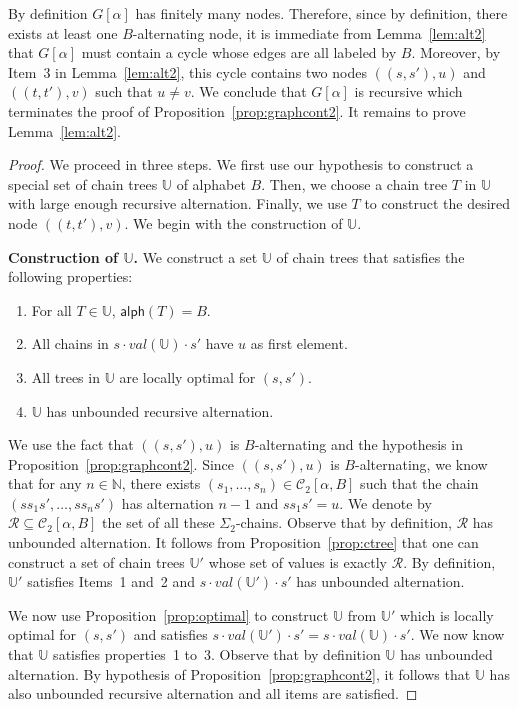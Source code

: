\documentclass[envcountsame]{llncs}
\newcommand\nat{\ensuremath{\mathbb{N}}\xspace}
\newcommand\Cs{\ensuremath{\mathcal{C}}\xspace}
\newcommand\Cstwo{\ensuremath{\Cs_2}\xspace}
\newcommand\Rs{\ensuremath{\mathcal{R}}\xspace}
\newcommand\crr{\ensuremath{\mathbb{U}}\xspace}
\newcommand{\sic}[1]{\ensuremath{\Sigma_{#1}}\xspace}
\newcommand\content[1]{\ensuremath{\contentmorphism(#1)}}
\newcommand\contentmorphism{\ensuremath{\textsf{alph}}}
\newcommand\chain{chain\xspace}
\newcommand\chains{chains\xspace}
\newcommand\qchains[1]{\ensuremath{\sic{#1}}-chains\xspace}
\newcommand\dchains{\qchains{2}}
\begin{document}
By definition $G[\alpha]$ has finitely many nodes. Therefore, since by
definition, there exists at least one $B$-alternating node, it is
immediate from Lemma~\ref{lem:alt2} that $G[\alpha]$ must contain a
cycle whose edges are all labeled by $B$. Moreover, by Item~3 in
Lemma~\ref{lem:alt2}, this cycle contains two nodes $((s,s'),u)$ and
$((t,t'),v)$ such that $u \neq v$. We conclude that $G[\alpha]$ is
recursive which terminates the proof of
Proposition~\ref{prop:graphcont2}. It remains to prove Lemma~\ref{lem:alt2}.  

\begin{proof} We proceed in three steps. We first use our hypothesis
  to construct a special set of \chain trees \crr of alphabet $B$.
  Then, we choose a \chain tree $T$ in \crr with large enough recursive
  alternation. Finally, we use $T$ to construct the desired node
  $((t,t'),v)$. We begin with the construction of \crr.

  \medskip
  \noindent
  {\bf Construction of \crr.} We construct a set \crr of \chain trees
  that satisfies the following properties: 
  \begin{enumerate}
  \item For all $ T \in \crr$, $\content{T} = B$.
  \item All \chains in $s \cdot val(\crr) \cdot s'$ have $u$ as first
    element.
  \item All trees in $\crr$ are locally optimal for $(s,s')$.
  \item $\crr$ has unbounded recursive alternation.
  \end{enumerate}
  We use the fact that $((s,s'),u)$ is $B$-alternating and the
  hypothesis in Proposition~\ref{prop:graphcont2}. Since $((s,s'),u)$ is
  $B$-alternating, we know that for any $n \in \nat$, there exists
  $(s_1,\dots,s_n) \in \Cstwo[\alpha,B]$ such that the \chain
  $(ss_1s',\dots,ss_ns')$ has alternation $n-1$ and $ss_1s' = u$. We 
  denote by $\Rs \subseteq \Cstwo[\alpha,B]$ the set of all these
  \dchains. Observe that by definition, $\Rs$ has unbounded
  alternation. It follows from Proposition~\ref{prop:ctree} that one 
  can construct a set of \chain trees $\crr'$ whose set of values
  is exactly $\Rs$. By definition, $\crr'$ satisfies Items~1 and~2 and
  $s \cdot val(\crr') \cdot s'$ has unbounded alternation.

  We now use Proposition~\ref{prop:optimal} to construct \crr from
  $\crr'$ which is locally optimal for $(s,s')$ and satisfies $s \cdot
  val(\crr') \cdot s' = s \cdot val(\crr) \cdot s'$. We now know that
  \crr satisfies properties~1 to~3. Observe that by definition \crr has
  unbounded alternation. By hypothesis of
  Proposition~\ref{prop:graphcont2}, it follows that \crr has also 
  unbounded recursive alternation and all items are satisfied.


\end{proof}
\end{document}
